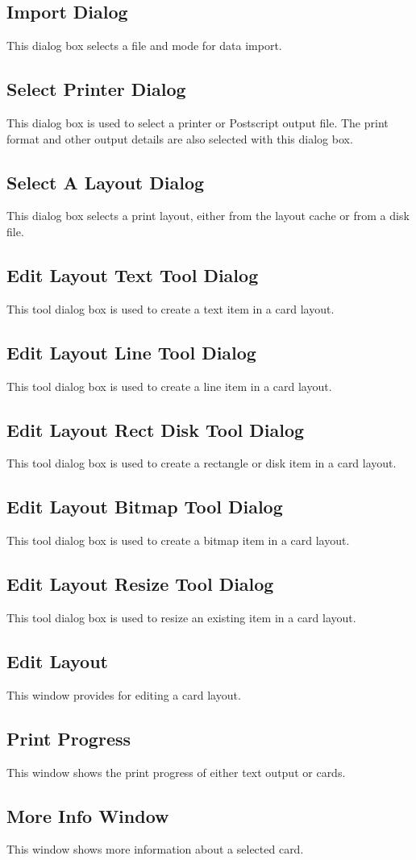 \subsection{Import Dialog}
This dialog box selects a file and mode for data import.
\subsection{Select Printer Dialog}
This dialog box is used to select a printer or Postscript output file.
The print format and other output details are also selected with this
dialog box.
\subsection{Select A Layout Dialog}
This dialog box selects a print layout, either from the layout cache or
from a disk file.
\subsection{Edit Layout Text Tool Dialog}
This tool dialog box is used to create a text item in a card layout.
\subsection{Edit Layout Line Tool Dialog}
This tool dialog box is used to create a line item in a card layout.
\subsection{Edit Layout Rect Disk Tool Dialog}
This tool dialog box is used to create a rectangle or disk item in a
card layout.
\subsection{Edit Layout Bitmap Tool Dialog}
This tool dialog box is used to create a bitmap item in a card layout.
\subsection{Edit Layout Resize Tool Dialog}
This tool dialog box is used to resize an existing item in a card layout.
\subsection{Edit Layout}
This window provides for editing a card layout.
\subsection{Print Progress}
This window shows the print progress of either text output or cards.
\subsection{More Info Window}
This window shows more information about a selected card.


